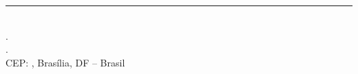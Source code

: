 \begin{flushleft}
\vspace{0.25 in}
\rule{10cm}{.1mm}\\
\imprimirdata.\\
\imprimirendereco.\\
CEP: \imprimirCEP, Brasília, DF -- Brasil\\
\end{flushleft}

\newpage










